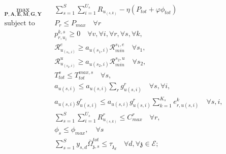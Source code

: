 \documentclass[conference]{IEEEtran}
\begin{document}
\begin{subequations}
\begin{alignat}{4}
\max\limits_{\boldsymbol{P}, \boldsymbol{A}, \boldsymbol{E}, \boldsymbol{M}, \boldsymbol{G}, \boldsymbol{Y} }   \quad &  \sum_{s=1}^{S}\sum_{i=1}^{U_s}R_{u_{(s,k)}}- \eta(P_{tot}+ \varphi \phi_{tot}) \ \\
\text{subject to} \quad  &  P_r \leq P_{max} \quad \forall r
 \label{c11} \\
&p_{r,u_i}^{k,s}  \geq 0  \quad \forall v,\forall i,\forall r,\forall s, \forall k,\label{c12} \\
&\mathcal{R}_{u_{(s_1,i)}}^e \geq  a_{u(s_1,i)}\mathcal{R}_{min}^{s_1,e} \quad \forall s_1, \label{c13} \\
&\mathcal{R}_{u_{(s_2,i)}}^u \geq  a_{u(s_2,i)}\mathcal{R}_{min}^{s_2,u} \quad \forall s_2, \label{c14} \\
&T_{tot}^s \leq T_{tot}^{max,s} \quad \forall s,\label{c15} \\
&a_{u(s,i)} \leq a_{u(s,i)}\sum_{r}g^r_{u(s,i)}  \quad \forall s,\forall i, \label{c16}  \\
& a_{u(s,i)}g^r_{u(s,i)} \leq a_{u(s,i)}g^r_{u(s,i)}\sum_{k =1}^{K_s} e^{k}_{r,u(s,i)}  \quad \forall s,i , \label{c21} \\
& \sum_{s=1}^{S}\sum_{i=1}^{U_s}R_{u_{(s,k)}}^r \leq C_{max}^r \quad \forall r, \label{c24}\\ 
& \phi_{s} \leq \phi_{max}, \quad \forall s \label{c22} \\
 &\textstyle \sum_{s=1}^{S} y_{s,d} \bar{\Omega}_{\mathfrak{z},s}^{tot}  \leq   \tau_{\mathfrak{z}_d} 
 \quad \forall d, \forall \mathfrak{z}\in \mathcal{E}; \label{c23}
\end{alignat}
\label{constraints}
\end{subequations}





\end{document}
